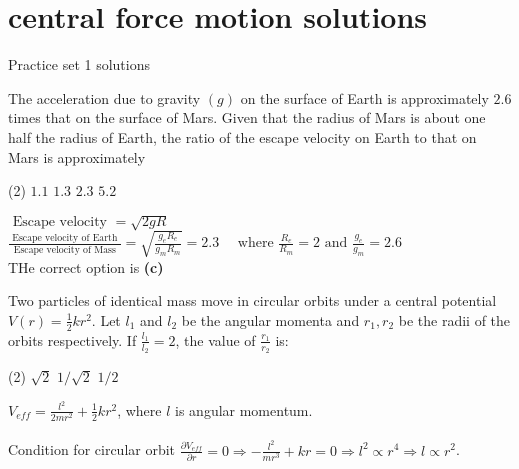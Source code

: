 \chapter{central force motion solutions}
\begin{abox}
	Practice set 1 solutions
	\end{abox}
\begin{enumerate}
	\begin{minipage}{\textwidth}
		\item The acceleration due to gravity $(g)$ on the surface of Earth is approximately $2.6$ times that on the surface of Mars. Given that the radius of Mars is about one half the radius of Earth, the ratio of the escape velocity on Earth to that on Mars is approximately
	\end{minipage}
	\begin{tasks}(2)
		\task[\textbf{A.}] $1.1$
		\task[\textbf{B.}]$1.3$
		\task[\textbf{C.}]$2.3$
		\task[\textbf{D.}]$5.2$
	\end{tasks}
\begin{answer}
	$\text { Escape velocity }=\sqrt{2 g R}$\\
	$\frac{\text { Escape velocity of Earth }}{\text { Escape velocity of Mass }}=\sqrt{\frac{g_{e} R_{e}}{g_{m} R_{m}}}=2.3 \quad \text { where } \frac{R_{e}}{R_{m}}=2 \text { and } \frac{g_{e}}{g_{m}}=2.6$\\
	THe correct option is \textbf{(c)}
\end{answer}
\begin{minipage}{\textwidth}
	\item Two particles of identical mass move in circular orbits under a central potential $V(r)=\frac{1}{2} k r^{2}$. Let $l_{1}$ and $l_{2}$ be the angular momenta and $r_{1}, r_{2}$ be the radii of the orbits respectively. If $\frac{l_{1}}{l_{2}}=2$, the value of $\frac{r_{1}}{r_{2}}$ is:
\end{minipage}
\begin{tasks}(2)
	\task[\textbf{A.}] $\sqrt{2}$
	\task[\textbf{B.}]$1 / \sqrt{2}$
	\task[\textbf{D.}] $1 / 2$
\end{tasks}
\begin{answer}
	 $V_{e f f}=\frac{l^{2}}{2 m r^{2}}+\frac{1}{2} k r^{2}$, where $l$ is angular momentum.\\\\
	Condition for circular orbit $\frac{\partial V_{e f f}}{\partial r}=0 \Rightarrow-\frac{l^{2}}{m r^{3}}+k r=0 \Rightarrow l^{2} \propto r^{4} \Rightarrow l \propto r^{2}$.\\

\end{answer}
\end{enumerate}
